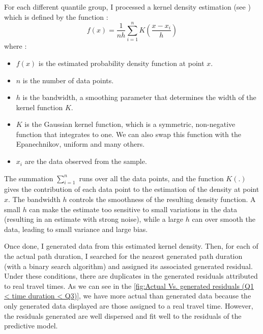 \documentclass[12pt]{article}
\begin{document}
For each different quantile group, I processed a kernel density estimation (see \cite{EMParzen}) which is defined by the function : 
\begin{equation}
f(x) = \frac{1}{nh} \sum_{i=1}^{n} K\left(\frac{x - x_i}{h}\right)
\end{equation}
where : 
\begin{itemize}
    \item \( f(x) \) is the estimated probability density function at point \( x \).
    \item \( n \) is the number of data points.
    \item \( h \) is the bandwidth, a smoothing parameter that determines the width of the kernel function \( K \).
    \item  \( K \) is the Gaussian kernel function, which is a symmetric, non-negative function that integrates to one. We can also swap this function with the Epanechnikov, uniform and many others.
    \item \( x_i \) are the data observed from the sample.
\end{itemize}



The summation \( \sum_{i=1}^{n} \) runs over all the data points, and the function \( K\left(.\right)\) gives the contribution of each data point to the estimation of the density at point \( x \). 
The bandwidth \( h \) controls the smoothness of the resulting density function. A small \( h \) can make the estimate too sensitive to small variations in the data (resulting in an estimate with strong noise), while a large \( h\) can over smooth the data, leading to small variance and large bias.

Once done, I generated data from this estimated kernel density. Then, for each of the actual path duration, I searched for the nearest generated path duration (with a binary search algorithm) and assigned its associated generated residual. Under these conditions, there are duplicates in the generated residuals attributed to real travel times. As we can see in the \autoref{fig:Actual Vs. generated residuals (Q1 < time duration < Q3)}, we have more actual than generated data because the only generated data displayed are those assigned to a real travel time. However, the residuals generated are well dispersed and fit well to the residuals of the predictive model.
\end{document}
